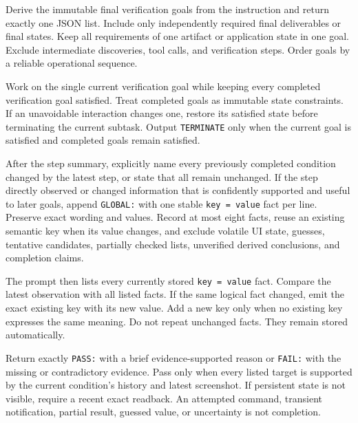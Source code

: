 \documentclass[11pt]{article}
\begin{document}
\begin{systembox}[title={Condition Extraction Prompt}]
Derive the immutable final verification goals from the instruction and return exactly one JSON list. Include only independently required final deliverables or final states. Keep all requirements of one artifact or application state in one goal. Exclude intermediate discoveries, tool calls, and verification steps. Order goals by a reliable operational sequence.
\end{systembox}

\begin{systembox}[title={Active-Condition Execution and Preservation Prompt}]
Work on the single current verification goal while keeping every completed verification goal satisfied. Treat completed goals as immutable state constraints. If an unavoidable interaction changes one, restore its satisfied state before terminating the current subtask. Output \texttt{TERMINATE} only when the current goal is satisfied and completed goals remain satisfied.
\end{systembox}

\begin{systembox}[title={Cross-Condition Facts and Change Monitoring Prompt}]
After the step summary, explicitly name every previously completed condition changed by the latest step, or state that all remain unchanged. If the step directly observed or changed information that is confidently supported and useful to later goals, append \texttt{GLOBAL:} with one stable \texttt{key = value} fact per line. Preserve exact wording and values. Record at most eight facts, reuse an existing semantic key when its value changes, and exclude volatile UI state, guesses, tentative candidates, partially checked lists, unverified derived conclusions, and completion claims.

The prompt then lists every currently stored \texttt{key = value} fact. Compare the latest observation with all listed facts. If the same logical fact changed, emit the exact existing key with its new value. Add a new key only when no existing key expresses the same meaning. Do not repeat unchanged facts. They remain stored automatically.
\end{systembox}

\begin{systembox}[title={Condition Verifier Prompt}]
Return exactly \texttt{PASS:} with a brief evidence-supported reason or \texttt{FAIL:} with the missing or contradictory evidence. Pass only when every listed target is supported by the current condition's history and latest screenshot. If persistent state is not visible, require a recent exact readback. An attempted command, transient notification, partial result, guessed value, or uncertainty is not completion.
\end{systembox}
\end{document}
